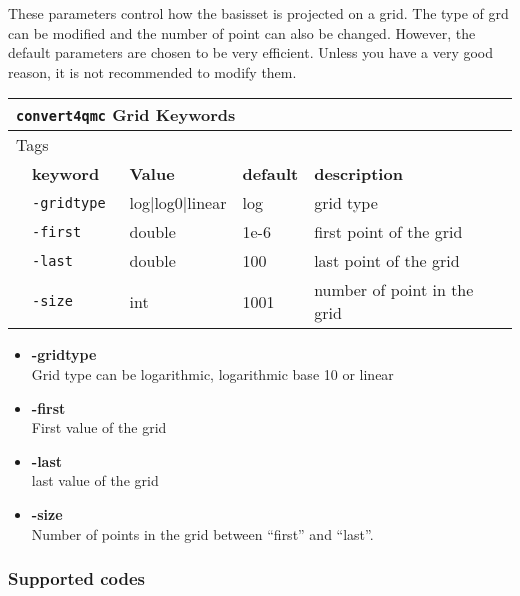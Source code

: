 % 
These parameters control how the basisset is projected on a grid. The type of grd can be modified and the number of point can also be changed. However, the default parameters are chosen to be very efficient. Unless you have a very good reason, it is not recommended to modify them. 
\begin{table}[h]
 \begin{center}
 \begin{tabularx}{\textwidth}{l l l l l }
 \hline
 \multicolumn{5}{l}{\texttt{convert4qmc} Grid Keywords} \\
 \hline
 \multicolumn{2}{l}{Tags}  & \multicolumn{3}{l}{}\\
    &   \bfseries keyword      & \bfseries Value & \bfseries default   & \bfseries description \\
    &   \texttt{-gridtype    } &  log|log0|linear      &  log & grid type  \\
    &   \texttt{-first         } & double  &  1e-6 & first point of the grid   \\
    &   \texttt{-last       } & double  & 100 & last point of the grid \\
    &   \texttt{-size      } &  int    &  1001& number of point in the grid   \\
     \hline
     \end{tabularx}
 \end{center}
 \end{table}
\begin{itemize}
\item \textbf{-gridtype}\\
Grid type can be logarithmic, logarithmic base 10 or linear \\
\item \textbf{-first}\\
First value of the grid\\
\item \textbf{-last}\\
last value of the grid\\
\item \textbf{-size}\\
Number of points in the grid between ``first'' and ``last''. \\
\end{itemize}


\subsubsection{Supported codes}

